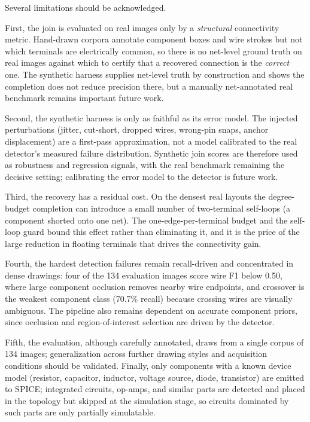 Several limitations should be acknowledged.

First, the join is evaluated on real images only by a \emph{structural} connectivity
metric. Hand-drawn corpora annotate component boxes and wire strokes but not which
terminals are electrically common, so there is no net-level ground truth on real
images against which to certify that a recovered connection is the \emph{correct}
one. The synthetic harness supplies net-level truth by construction and shows the
completion does not reduce precision there, but a manually net-annotated real
benchmark remains important future work.

Second, the synthetic harness is only as faithful as its error model. The injected
perturbations (jitter, cut-short, dropped wires, wrong-pin snaps, anchor
displacement) are a first-pass approximation, not a model calibrated to the real
detector's measured failure distribution. Synthetic join scores are therefore used
as robustness and regression signals, with the real benchmark remaining the
decisive setting; calibrating the error model to the detector is future work.

Third, the recovery has a residual cost. On the densest real layouts the
degree-budget completion can introduce a small number of two-terminal self-loops
(a component shorted onto one net). The one-edge-per-terminal budget and the
self-loop guard bound this effect rather than eliminating it, and it is the price
of the large reduction in floating terminals that drives the connectivity gain.

Fourth, the hardest detection failures remain recall-driven and concentrated in
dense drawings: four of the 134 evaluation images score wire F1 below 0.50, where
large component occlusion removes nearby wire endpoints, and crossover is the
weakest component class (70.7\% recall) because crossing wires are visually
ambiguous. The pipeline also remains dependent on accurate component priors, since
occlusion and region-of-interest selection are driven by the detector.

Fifth, the evaluation, although carefully annotated, draws from a single corpus of
134 images; generalization across further drawing styles and acquisition
conditions should be validated. Finally, only components with a known device model
(resistor, capacitor, inductor, voltage source, diode, transistor) are emitted to
SPICE; integrated circuits, op-amps, and similar parts are detected and placed in
the topology but skipped at the simulation stage, so circuits dominated by such
parts are only partially simulatable.
